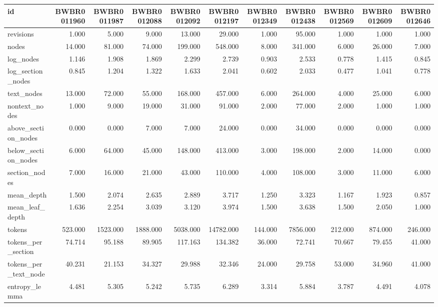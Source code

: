 \begin{tabular}{lrrrrrrrrrr}
\toprule
id & BWBR0011960 & BWBR0011987 & BWBR0012088 & BWBR0012092 & BWBR0012197 & BWBR0012349 & BWBR0012438 & BWBR0012569 & BWBR0012609 & BWBR0012646 \\
\midrule
revisions & 1.000 & 5.000 & 9.000 & 13.000 & 29.000 & 1.000 & 95.000 & 1.000 & 1.000 & 1.000 \\
\cline{1-11}
nodes & 14.000 & 81.000 & 74.000 & 199.000 & 548.000 & 8.000 & 341.000 & 6.000 & 26.000 & 7.000 \\
\cline{1-11}
log\_nodes & 1.146 & 1.908 & 1.869 & 2.299 & 2.739 & 0.903 & 2.533 & 0.778 & 1.415 & 0.845 \\
\cline{1-11}
log\_section\_nodes & 0.845 & 1.204 & 1.322 & 1.633 & 2.041 & 0.602 & 2.033 & 0.477 & 1.041 & 0.778 \\
\cline{1-11}
text\_nodes & 13.000 & 72.000 & 55.000 & 168.000 & 457.000 & 6.000 & 264.000 & 4.000 & 25.000 & 6.000 \\
\cline{1-11}
nontext\_nodes & 1.000 & 9.000 & 19.000 & 31.000 & 91.000 & 2.000 & 77.000 & 2.000 & 1.000 & 1.000 \\
\cline{1-11}
above\_section\_nodes & 0.000 & 0.000 & 7.000 & 7.000 & 24.000 & 0.000 & 34.000 & 0.000 & 0.000 & 0.000 \\
\cline{1-11}
below\_section\_nodes & 6.000 & 64.000 & 45.000 & 148.000 & 413.000 & 3.000 & 198.000 & 2.000 & 14.000 & 0.000 \\
\cline{1-11}
section\_nodes & 7.000 & 16.000 & 21.000 & 43.000 & 110.000 & 4.000 & 108.000 & 3.000 & 11.000 & 6.000 \\
\cline{1-11}
mean\_depth & 1.500 & 2.074 & 2.635 & 2.889 & 3.717 & 1.250 & 3.323 & 1.167 & 1.923 & 0.857 \\
\cline{1-11}
mean\_leaf\_depth & 1.636 & 2.254 & 3.039 & 3.120 & 3.974 & 1.500 & 3.638 & 1.500 & 2.050 & 1.000 \\
\cline{1-11}
tokens & 523.000 & 1523.000 & 1888.000 & 5038.000 & 14782.000 & 144.000 & 7856.000 & 212.000 & 874.000 & 246.000 \\
\cline{1-11}
tokens\_per\_section & 74.714 & 95.188 & 89.905 & 117.163 & 134.382 & 36.000 & 72.741 & 70.667 & 79.455 & 41.000 \\
\cline{1-11}
tokens\_per\_text\_node & 40.231 & 21.153 & 34.327 & 29.988 & 32.346 & 24.000 & 29.758 & 53.000 & 34.960 & 41.000 \\
\cline{1-11}
entropy\_lemma & 4.481 & 5.305 & 5.242 & 5.735 & 6.289 & 3.314 & 5.884 & 3.787 & 4.491 & 4.078 \\

\end{tabular}
